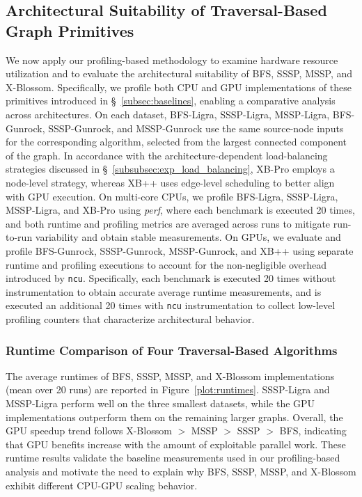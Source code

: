 \subsection{Architectural Suitability of Traversal-Based Graph Primitives}
We now apply our profiling-based methodology to examine hardware resource utilization and to evaluate the architectural suitability of BFS, SSSP, MSSP, and X-Blossom. 
Specifically, we profile both CPU and GPU implementations of these primitives introduced in \S~\ref{subsec:baselines}, enabling a comparative analysis across architectures.
On each dataset, BFS-Ligra, SSSP-Ligra, MSSP-Ligra, BFS-Gunrock, SSSP-Gunrock, and MSSP-Gunrock use the same source-node inputs for the corresponding algorithm, selected from the largest connected component of the graph.
In accordance with the architecture-dependent load-balancing strategies discussed in \S~\ref{subsubsec:exp_load_balancing}, XB-Pro employs a node-level strategy, whereas XB++ uses edge-level scheduling to better align with GPU execution.
On multi-core CPUs, we profile BFS-Ligra, SSSP-Ligra, MSSP-Ligra, and XB-Pro using \emph{perf}, where 
each benchmark is executed 20 times, and both runtime and profiling metrics are averaged across runs to mitigate run-to-run variability and obtain stable measurements.
On GPUs, we evaluate and profile BFS-Gunrock, SSSP-Gunrock, MSSP-Gunrock, and XB++ using separate runtime and profiling executions to account for the non-negligible overhead introduced by \texttt{ncu}. 
Specifically, each benchmark is executed 20 times without instrumentation to obtain accurate average runtime measurements, and is executed an additional 20 times with \texttt{ncu} instrumentation to collect low-level profiling counters that characterize architectural behavior.
\subsubsection{Runtime Comparison of Four Traversal-Based Algorithms}
\label{subsubsec:runtime-comparison}

The average runtimes of BFS, SSSP, MSSP, and X-Blossom implementations (mean over 20 runs) are reported in Figure~\ref{plot:runtimes}.
SSSP-Ligra and MSSP-Ligra perform well on the three smallest datasets, while the GPU implementations outperform them on the remaining larger graphs. Overall, the GPU speedup trend follows X-Blossom $>$ MSSP $>$ SSSP $>$ BFS, indicating that GPU benefits increase with the amount of exploitable parallel work. These runtime results validate the baseline measurements used in our profiling-based analysis and motivate the need to explain why BFS, SSSP, MSSP, and X-Blossom exhibit different CPU-GPU scaling behavior.

